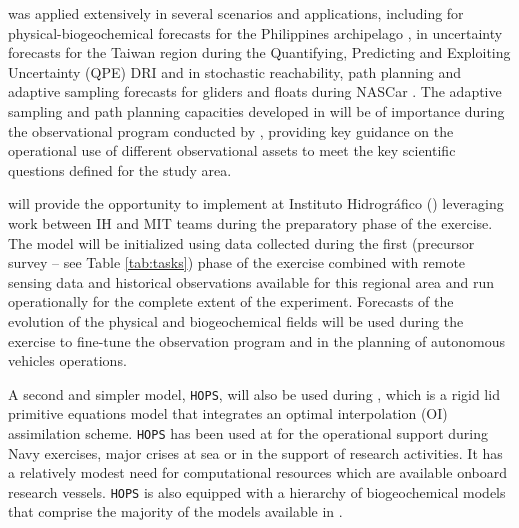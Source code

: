 \mse was applied extensively in several scenarios and applications,
including for physical-biogeochemical forecasts for the Philippines
archipelago \cite{lermusiaux11}, in uncertainty forecasts for the
Taiwan region during the Quantifying, Predicting and Exploiting
Uncertainty (QPE) DRI \cite{gawarkiewicz11} and in stochastic
reachability, path planning and adaptive sampling forecasts for
gliders and floats during NASCar \cite{lermusiaux17}. The adaptive
sampling and path planning capacities developed in \mse will be of
importance during the observational program conducted by \proje,
providing key guidance on the operational use of different
observational assets to meet the key scientific questions defined for
the study area.


\proj will provide the opportunity to implement \mse at Instituto
Hidrogr\'{a}fico (\inste) leveraging work between IH and MIT teams
during the preparatory phase of the exercise. The model will be
initialized using data collected during the first (precursor survey --
see Table \ref{tab:tasks}) phase of the exercise combined with remote
sensing data and historical observations available for this regional
area and run operationally for the complete extent of the
experiment. Forecasts of the evolution of the physical and
biogeochemical fields will be used during the exercise to fine-tune
the observation program and in the planning of autonomous vehicles
operations.

A second and simpler model, \texttt{HOPS}, will also be used during
\proje, which is a rigid lid primitive equations model that integrates
an optimal interpolation (OI) assimilation scheme. \texttt{HOPS} has
been used at \inst for the operational support during Navy exercises,
major crises at sea or in the support of research activities. It has a
relatively modest need for computational resources which are available
onboard research vessels. \texttt{HOPS} is also equipped with a
hierarchy of biogeochemical models that comprise the majority of the
models available in \msee.

